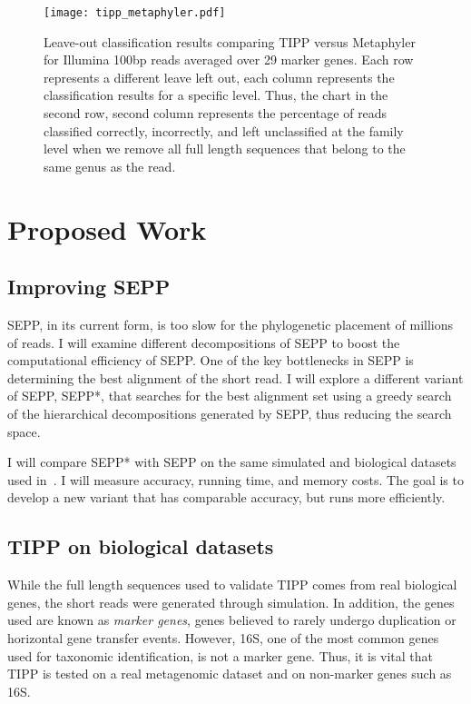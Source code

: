 \documentclass[times, 10pt]{article}
\begin{document}
\begin{figure}[htbp]
    \texttt{[image: tipp\_metaphyler.pdf]}
  
  \caption{\label{fig:tipp_metaphyler}Leave-out classification results comparing TIPP versus Metaphyler for Illumina 100bp reads averaged over 29 marker genes.  Each row represents a different leave left out, each column represents the classification results for a specific level.  Thus, the chart in the second row, second column represents the percentage of reads classified correctly, incorrectly, and left unclassified at the family level when we remove all full length sequences that belong to the same genus as the read.}
\end{figure}

\section{Proposed Work}


\subsection{Improving SEPP}
SEPP, in its current form, is too slow for the phylogenetic placement of millions of reads.  I will examine different decompositions of SEPP to boost the computational efficiency of SEPP.  One of the key bottlenecks in SEPP is determining the best alignment of the short read.  I will explore a different variant of SEPP, SEPP*, that searches for the best alignment set using a greedy search of the hierarchical decompositions generated by SEPP, thus reducing the search space.

I will compare SEPP* with SEPP on the same simulated and biological datasets used in~\cite{Mirarab2012}.  I will measure accuracy, running time, and memory costs.  The goal is to develop a new variant that has comparable accuracy, but runs more efficiently.

\subsection{TIPP on biological datasets}
While the full length sequences used to validate TIPP comes from real biological genes, the short reads were generated through simulation.  In addition, the genes used are known as \emph{marker genes}, genes believed to rarely undergo duplication or horizontal gene transfer events.  However, 16S, one of the most common genes used for taxonomic identification, is not a marker gene.  Thus, it is vital that TIPP is tested on a real metagenomic dataset and on non-marker genes such as 16S.  
\end{document}
